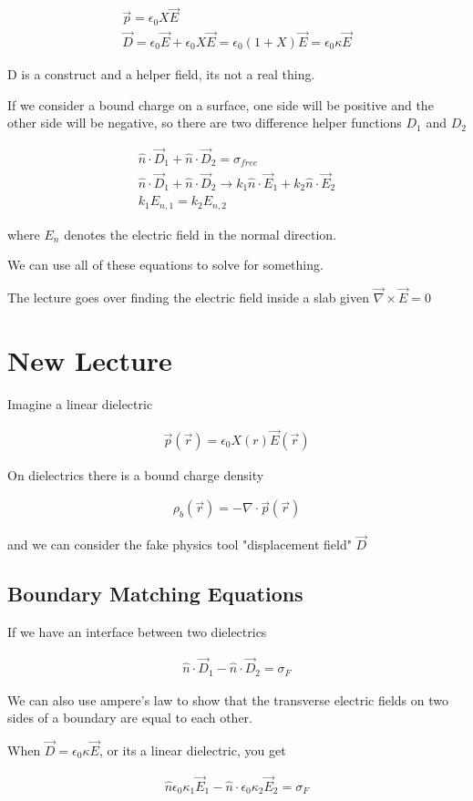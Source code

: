 \documentclass[fleqn]{report}
\newcommand{\equations} [1] {
\begin{gather*}
#1
\end{gather*}
}
\begin{document}
\equations{
    \vec p = \epsilon_0 X \vec E 
    \\
    \vec D 
    =
    \epsilon_0 \vec E 
    +
    \epsilon_0 X \vec E 
    =
    \epsilon_0 (1 + X) \vec E
    =
    \epsilon_0 \kappa \vec E 
}

D is a construct and a helper field, its not a real thing. 

If we consider a bound charge on a surface, one side will be positive and 
the other side will be negative, so there are two difference 
helper functions $D_1$ and $D_2$

\equations{
    \hat n \cdot \vec D_1
    +
    \hat n \cdot \vec D_2
    =
    \sigma_{free}
    \\
    \hat n \cdot \vec D_1 
    +
    \hat n \cdot \vec D_2
    \rightarrow 
    k_1 \hat n \cdot \vec E_1
    +
    k_2 \hat n \cdot \vec E_2
    \\
    k_1 E_{n, 1}
    =
    k_2 E_{n, 2}
}
where $E_{n}$ denotes the electric field in the normal direction. 

We can use all of these equations to solve for something. 

The lecture goes over finding the electric field inside a slab 
given $\vec \nabla \times \vec E = 0$ 

\section{New Lecture}
Imagine a linear dielectric 
\equations{
    \vec p(\vec r)= \epsilon_0 X(r) \vec E(\vec r )
}
On dielectrics there is a bound charge density 
\equations{
    \rho_b(\vec r) = - \nabla \cdot \vec p(\vec r)
}

and we can consider the fake physics tool "displacement field" $\vec D$ 

\subsection{Boundary Matching Equations}
If we have an interface between two dielectrics 
\equations{
    \hat n \cdot \vec D_1 - \hat n \cdot \vec D_2 = \sigma_F
}

We can also use ampere's law to show that the transverse electric fields 
on two sides of a boundary are equal to each other. 

When $\vec D = \epsilon_0 \kappa \vec E$, or its a linear dielectric, you get 
\equations{
    \hat n \epsilon_0 \kappa_1 \vec E_1 - 
    \hat n \cdot \epsilon_0 \kappa_2 \vec E_2 = \sigma_F
}
\end{document}
